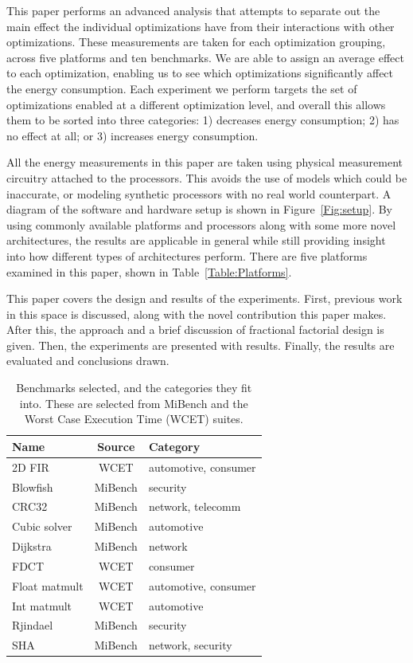 \documentclass[twocolumn]{article}
\let\oldcaption\caption
\renewcommand{\caption}[1]{\oldcaption{\textup{#1}}}
\begin{document}
This paper performs an advanced analysis that attempts to separate out the main effect the individual optimizations have from their interactions with other optimizations. These measurements are taken for each optimization grouping, across five platforms and ten benchmarks. We are able to assign an average effect to each optimization, enabling us to see which optimizations significantly affect the energy consumption. Each experiment we perform targets the set of optimizations enabled at a different optimization level, and overall this allows them to be sorted into three categories: 1) decreases energy consumption; 2) has no effect at all; or 3) increases energy consumption.

All the energy measurements in this paper are taken using physical measurement circuitry attached to the processors. This avoids the use of models which could be inaccurate, or modeling synthetic processors with no real world counterpart. A diagram of the software and hardware setup is shown in Figure~\ref{Fig:setup}. By using commonly available platforms and processors along with some more novel architectures, the results are applicable in general while still providing insight into how different types of architectures perform. There are five platforms examined in this paper, shown in Table~\ref{Table:Platforms}.


This paper covers the design and results of the experiments. First, previous work in this space is discussed, along with the novel contribution this paper makes. After this, the approach and a brief discussion of fractional factorial design is given. Then, the experiments are presented with results. Finally, the results are evaluated and conclusions drawn.


\begin{table}[t]
	\centering
	\begin{tabular}{l c l}
	\textbf{Name}			& \textbf{Source} 	& \textbf{Category} \\
	\hline
	2D FIR					& WCET 		& automotive, consumer	\\
	Blowfish				& MiBench 	& security	\\
	CRC32					& MiBench 	& network, telecomm	\\
	Cubic solver			& MiBench 	& automotive	\\
	Dijkstra				& MiBench 	& network	\\
	FDCT					& WCET 		& consumer	\\
	Float matmult			& WCET 		& automotive, consumer	\\
	Int matmult				& WCET	 	& automotive	\\
	Rjindael				& MiBench 	& security	\\
	SHA						& MiBench 	& network, security	\\
	\end{tabular}
\caption{Benchmarks selected, and the categories they fit into. These are selected from MiBench\cite{MiBench} and the Worst Case Execution Time (WCET)\cite{WCET} suites.}
\label{Table:Benchmarks}
\end{table}
\end{document}

